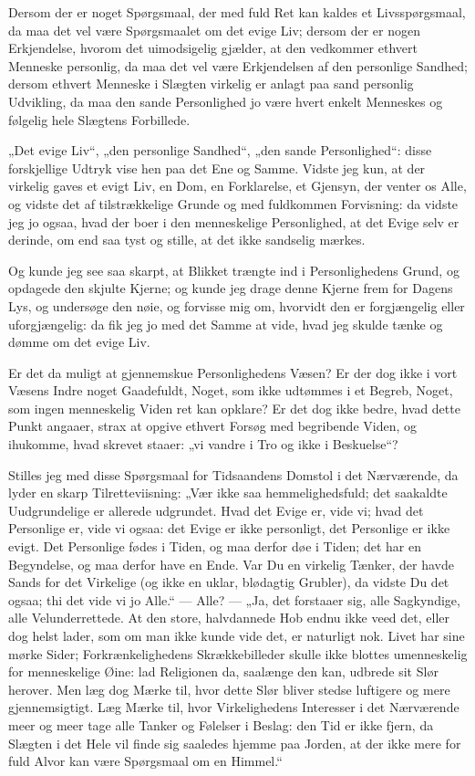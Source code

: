 \documentclass[12pt,a4paper]{book}
\newcommand{\apage}[1]{\marginnote{\footnotesize\textit{[#1]}}}
\begin{document}
Dersom der er noget Spørgsmaal, der med fuld Ret kan kaldes et Livsspørgsmaal, da maa det vel være Spørgsmaalet om det evige Liv; dersom der er nogen Erkjendelse, hvorom det uimodsigelig gjælder, at den vedkommer ethvert Menneske personlig, da maa det vel være Erkjendelsen af den personlige Sandhed; dersom ethvert Menneske i Slægten virkelig er anlagt paa sand personlig Udvikling, da maa den sande Personlighed jo være hvert enkelt Menneskes og følgelig hele Slægtens Forbillede.

„Det evige Liv“, „den personlige Sandhed“, „den sande Personlighed“: disse forskjellige Udtryk vise hen paa det Ene og Samme. Vidste jeg kun, at der virkelig gaves et evigt Liv, en Dom, en Forklarelse, et Gjensyn, der venter os Alle, og vidste det af tilstrækkelige Grunde og med fuldkommen Forvisning: da vidste jeg jo ogsaa, hvad der boer i den menneskelige Personlighed, at det Evige selv er derinde, om end saa tyst og stille, at det ikke sandselig mærkes.

Og kunde jeg see saa skarpt, at Blikket trængte ind i Personlighedens Grund, og opdagede den skjulte Kjerne; og kunde jeg drage denne Kjerne frem for Dagens Lys, og undersøge den nøie, og forvisse mig om, hvorvidt den \apage{2} er
forgjængelig eller uforgjængelig: da fik jeg jo med det Samme at vide, hvad jeg skulde tænke og dømme om det evige Liv.

Er det da muligt at gjennemskue Personlighedens Væsen? Er der dog ikke i vort Væsens Indre noget Gaadefuldt, Noget, som ikke udtømmes i et Begreb, Noget, som ingen menneskelig Viden ret kan opklare? Er det dog ikke bedre, hvad dette Punkt angaaer, strax at opgive ethvert Forsøg med begribende Viden, og ihukomme, hvad skrevet staaer: „vi vandre i Tro og ikke i Beskuelse“?

Stilles jeg med disse Spørgsmaal for Tidsaandens Domstol i det Nærværende, da lyder en skarp Tilretteviisning: „Vær ikke saa hemmelighedsfuld; det saakaldte Uudgrundelige er allerede udgrundet. Hvad det Evige er, vide vi; hvad det Personlige er, vide vi ogsaa: det Evige er ikke personligt, det Personlige er ikke evigt. Det Personlige fødes i Tiden, og maa derfor døe i Tiden; det har en Begyndelse, og maa derfor have en Ende. Var Du en virkelig Tænker, der havde Sands for det Virkelige (og ikke en uklar, blødagtig Grubler), da vidste Du det ogsaa; thi det vide vi jo Alle.“ --- Alle? --- „Ja, det forstaaer sig, alle Sagkyndige, alle Velunderrettede. At den store, halvdannede Hob endnu ikke veed det, eller dog helst lader, som om man ikke kunde vide det, er naturligt nok. Livet har sine mørke Sider; Forkrænkelighedens Skrækkebilleder skulle ikke blottes umenneskelig for menneskelige Øine: lad Religionen da, saalænge den kan, udbrede sit Slør herover. Men læg dog Mærke til, hvor dette Slør bliver stedse luftigere og mere gjennemsigtigt. Læg Mærke til, hvor Virkelighedens Interesser i det Nærværende meer og meer tage alle Tanker og Følelser i Beslag: den Tid er ikke fjern, da Slægten i det Hele vil finde sig saaledes hjemme paa Jorden, at der ikke mere for fuld Alvor kan være Spørgsmaal om en Himmel.“
\end{document}
